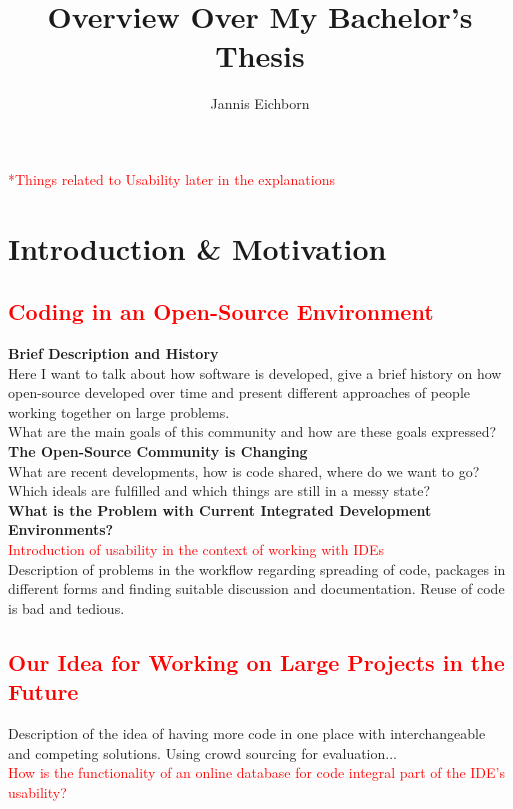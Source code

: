 \documentclass[11p]{scrartcl}
\title{Overview Over My Bachelor's Thesis}
\author{Jannis Eichborn}
\begin{document}
\begin{titlepage}
\maketitle
\textcolor{red}{*Things related to Usability later in the explanations}
\tableofcontents
\end{titlepage}

\section{Introduction \& Motivation}
\label{sec:introduction}
\subsection{\textcolor{red}{Coding in an Open-Source Environment}}

\textbf{Brief Description and History}\\
Here I want to talk about how software is developed, give a brief history on how open-source developed over time and present different approaches of people working together on large problems. \\
What are the main goals of this community and how are these goals expressed?\\

\textbf{The Open-Source Community is Changing}\\
What are recent developments, how is code shared, where do we want to go?
Which ideals are fulfilled and which  things are still in a messy state?\\

\textbf{What is the Problem with Current Integrated Development Environments?}\\
\textcolor{red}{Introduction of usability in the context of working with IDEs}\\
Description of problems in the workflow regarding spreading of code, packages in different forms and finding suitable discussion and documentation. Reuse of code is bad and tedious.


\subsection{\textcolor{red}{Our Idea for Working on Large Projects in the Future}}
Description of the idea of having more code in one place with interchangeable and competing solutions. Using crowd sourcing for evaluation...\\
\textcolor{red}{How is the functionality of an online database for code integral part of the IDE's usability?}\\
\end{document}
